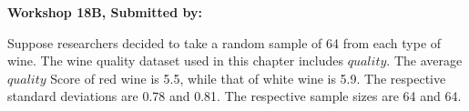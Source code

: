 \documentclass[11pt]{book}\usepackage[]{graphicx}\usepackage[]{color}
\begin{document}
\begin{exercises}
\begin{exercise}
\end{exercise}
\begin{solution}  %


\end{solution}

\clearpage

    \begin{exercise}  %



    \begin{center}
\begin{flushleft}\textbf{\large \hfill Workshop 18B, Submitted by: }\end{flushleft}

\end{center}

Suppose researchers decided to take a random sample of 64 from each type of wine.  The wine quality dataset used in this chapter includes $quality$. The average $quality$ Score of red wine is 5.5, while that of white wine is 5.9. The respective standard deviations are 0.78 and 0.81. The respective sample sizes are 64 and 64.


\end{exercise}
\end{exercises}
\end{document}
